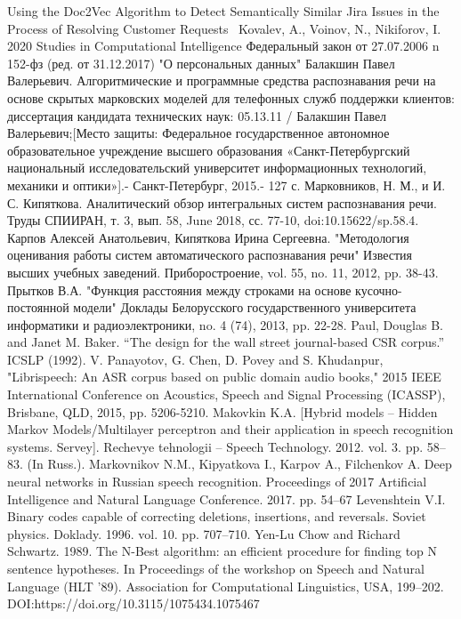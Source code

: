 \documentclass[conference]{IEEEtran}
\begin{document}
\begin{thebibliography}{00}
 Using the Doc2Vec Algorithm to Detect Semantically Similar Jira Issues in the Process of Resolving Customer Requests  Kovalev, A., Voinov, N., Nikiforov, I. 2020 Studies in Computational Intelligence
 Федеральный закон от 27.07.2006 n 152-фз (ред. от 31.12.2017) "О персональных данных"
 Балакшин Павел Валерьевич. Алгоритмические и программные средства распознавания речи на основе скрытых марковских моделей для телефонных служб поддержки клиентов: диссертация кандидата технических наук: 05.13.11 / Балакшин Павел Валерьевич;[Место защиты: Федеральное государственное автономное образовательное учреждение высшего образования «Санкт-Петербургский национальный исследовательский университет информационных технологий, механики и оптики»].- Санкт-Петербург, 2015.- 127 с.
 Марковников, Н. М., и И. С. Кипяткова. Аналитический обзор интегральных систем распознавания речи. Труды СПИИРАН, т. 3, вып. 58, June 2018, сс. 77-10, doi:10.15622/sp.58.4.
 Карпов Алексей Анатольевич, Кипяткова Ирина Сергеевна. "Методология оценивания работы систем автоматического распознавания речи" Известия высших учебных заведений. Приборостроение, vol. 55, no. 11, 2012, pp. 38-43.
 Прытков В.А. "Функция расстояния между строками на основе кусочно-постоянной модели" Доклады Белорусского государственного университета информатики и радиоэлектроники, no. 4 (74), 2013, pp. 22-28.
 Paul, Douglas B. and Janet M. Baker. “The design for the wall street journal-based CSR corpus.” ICSLP (1992).
 V. Panayotov, G. Chen, D. Povey and S. Khudanpur, "Librispeech: An ASR corpus based on public domain audio books," 2015 IEEE International Conference on Acoustics, Speech and Signal Processing (ICASSP), Brisbane, QLD, 2015, pp. 5206-5210.
 Makovkin K.A. [Hybrid models – Hidden Markov Models/Multilayer perceptron and their application in speech recognition systems. Servey]. Rechevye tehnologii – Speech Technology. 2012. vol. 3. pp. 58–83. (In Russ.).
 Markovnikov N.M., Kipyatkova I., Karpov A., Filchenkov A. Deep neural networks in Russian speech recognition. Proceedings of 2017 Artificial Intelligence and Natural Language Conference. 2017. pp. 54–67
 Levenshtein V.I. Binary codes capable of correcting deletions, insertions, and reversals. Soviet physics. Doklady. 1996. vol. 10. pp. 707–710.
 Yen-Lu Chow and Richard Schwartz. 1989. The N-Best algorithm: an efficient procedure for finding top N sentence hypotheses. In Proceedings of the workshop on Speech and Natural Language (HLT ’89). Association for Computational Linguistics, USA, 199–202. DOI:https://doi.org/10.3115/1075434.1075467

\end{thebibliography}
\end{document}
